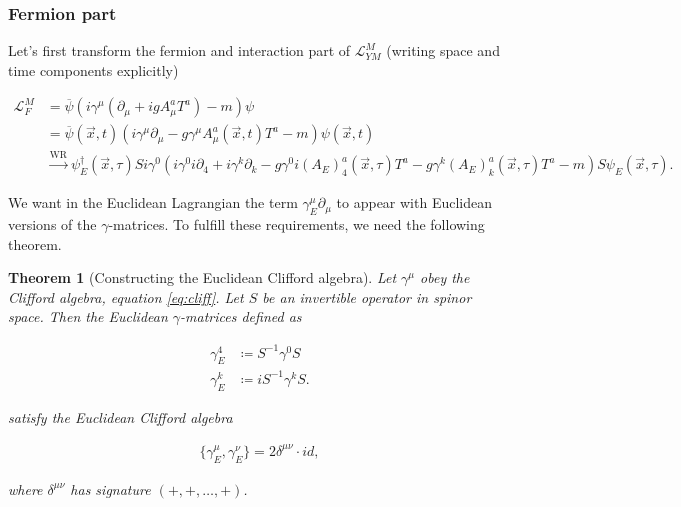 \documentclass{article}
\theoremstyle{plain} %
\newtheorem{theorem}{Theorem}[section]
\theoremstyle{convention} %
\theoremstyle{remark} %
\numberwithin{equation}{section}
\begin{document}
\subsubsection{Fermion part}

Let's first transform the fermion and interaction part of $\mathcal{L}_{YM}^M$ (writing space and time components explicitly)

\begin{align*}
    \mathcal{L}_{F}^M &= \overline{\psi} \left( i \gamma^{\mu} \left( \partial_{\mu} + ig A_{\mu}^a T^a \right)  - m \right) \psi \\
    &= \overline{\psi}(\vec{x},t) \left( i \gamma^{\mu} \partial_{\mu} - g \gamma^{\mu} A_{\mu}^a(\vec{x}, t) T^a - m \right) \psi(\vec{x},t) \\
    &\stackrel{\text{WR}}{\longrightarrow} \psi_E^{\dagger}(\vec{x},\tau) S i \gamma^0 \left( i \gamma^0 i \partial_4 + i \gamma^k \partial_k - g \gamma^0 i (A_E)_4^a(\vec{x}, \tau) T^a - g \gamma^k (A_E)_k^a(\vec{x}, \tau) T^a - m \right) S \psi_E(\vec{x},\tau).
\end{align*}

We want in the Euclidean Lagrangian the term $\gamma_E^{\mu} \partial_{\mu}$ to appear with Euclidean versions of the $\gamma$-matrices. To fulfill these requirements, we need the following theorem.

\begin{theorem}[Constructing the Euclidean Clifford algebra]

Let $\gamma^{\mu}$ obey the Clifford algebra, equation \eqref{eq:cliff}. Let $S$ be an invertible operator in spinor space. Then the Euclidean $\gamma$-matrices defined as 

\begin{align*}
    \gamma_E^4 &\coloneqq S^{-1} \gamma^0 S \\
    \gamma_E^k &\coloneqq i S^{-1} \gamma^k S.
\end{align*}

satisfy the Euclidean Clifford algebra

\begin{align*}
    \{\gamma_E^{\mu}, \gamma_E^{\nu}\} = 2 \delta^{\mu \nu} \cdot id,
\end{align*}

where $\delta^{\mu \nu}$ has signature $(+, +, \dots, +)$.

\end{theorem}
\end{document}
